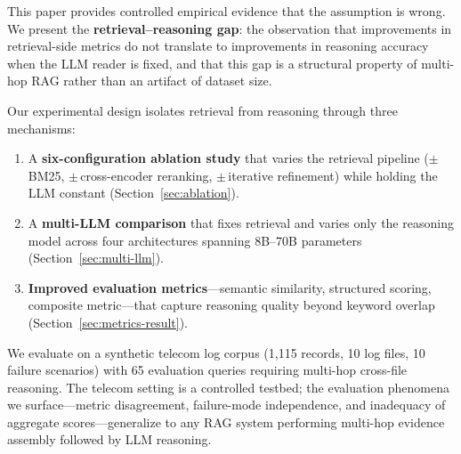 \documentclass[11pt,a4paper]{article}
\begin{document}
This paper provides controlled empirical evidence that the assumption
is wrong.
We present the \textbf{retrieval--reasoning gap}: the observation that
improvements in retrieval-side metrics do not translate to improvements
in reasoning accuracy when the LLM reader is fixed, and that this
gap is a structural property of multi-hop RAG rather than an artifact
of dataset size.

Our experimental design isolates retrieval from reasoning through
three mechanisms:
\begin{enumerate}[nosep]
    \item A \textbf{six-configuration ablation study} that varies the
    retrieval pipeline ($\pm$\,BM25, $\pm$\,cross-encoder reranking,
    $\pm$\,iterative refinement) while holding the LLM constant
    (Section~\ref{sec:ablation}).
    \item A \textbf{multi-LLM comparison} that fixes retrieval and
    varies only the reasoning model across four architectures spanning
    8B--70B parameters (Section~\ref{sec:multi-llm}).
    \item \textbf{Improved evaluation metrics}---semantic similarity,
    structured scoring, composite metric---that capture reasoning
    quality beyond keyword overlap (Section~\ref{sec:metrics-result}).
\end{enumerate}

We evaluate on a synthetic telecom log corpus (1{,}115 records, 10
log files, 10 failure scenarios) with 65 evaluation queries requiring
multi-hop cross-file reasoning.
The telecom setting is a controlled testbed; the evaluation phenomena
we surface---metric disagreement, failure-mode independence, and
inadequacy of aggregate scores---generalize to any RAG system
performing multi-hop evidence assembly followed by LLM reasoning.
\end{document}
